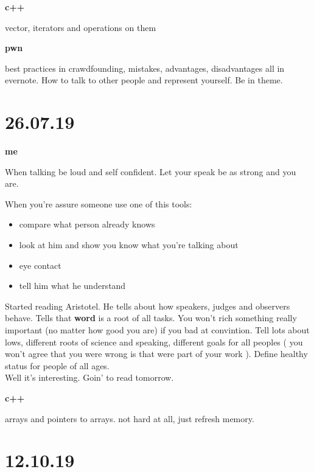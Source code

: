 \documentclass[12pt,a4paper,titlepage]{article}
\begin{document}
\begin{center}
  \large \textbf{c++}
\end{center}

vector, iterators and operations on them

\begin{center}
  \large \textbf{pwn}
\end{center}

best practices in crawdfounding, mistakes, advantages, disadvantages all in evernote.
How to talk to other people and represent yourself. Be in theme.

\newpage
\section{26.07.19}

\begin{center}
  \large \textbf{me}
\end{center}

When talking be loud and self confident. Let your speak be as strong and you are.

When you're assure someone use one of this tools:
\begin{itemize}
  \item compare what person already knows
  \item look at him and show you know what you're talking about
  \item eye contact
  \item tell him what he understand
\end{itemize}

Started reading Aristotel. He tells about how speakers, judges and obser\-vers behave. Tells that \textbf{word} is a root of all tasks. You won't rich something really important (no matter how good you are) if you bad at convintion. Tell lots about lows, different roots of science and speaking, different goals for all peoples ( you won't agree that you were wrong is that were part of your work ). Define healthy status for people of all ages.\\
Well it's interesting. Goin' to read tomorrow.

\begin{center}
  \large \textbf{c++}
\end{center}

arrays and pointers to arrays. not hard at all, just refresh memory.

\newpage
\section{12.10.19}
\end{document}
